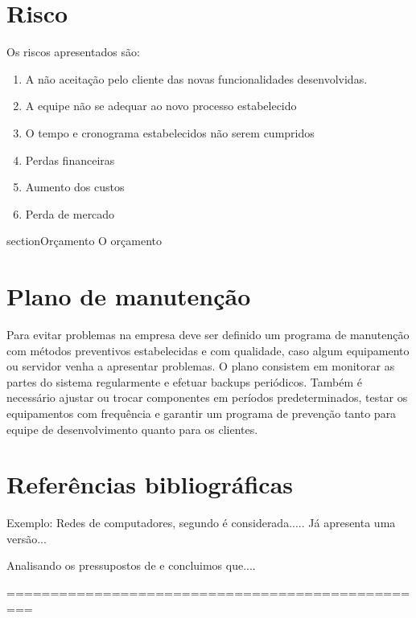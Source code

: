 \documentclass[	DIV=calc,%
							paper=a4,%
							fontsize=12pt,%
							onecolumn]{scrartcl}	 					%
\begin{document}
\section{Risco}
Os riscos apresentados são:

\begin{enumerate}
	\item A não aceitação pelo cliente das novas funcionalidades desenvolvidas.
	\item A equipe não se adequar ao novo processo estabelecido
	\item O tempo e cronograma estabelecidos não serem cumpridos
	\item Perdas financeiras
	\item Aumento dos custos
	\item Perda de mercado
\end{enumerate}


section{Orçamento}
O orçamento 

\section{Plano de manutenção}
Para evitar problemas na empresa deve ser definido um programa de manutenção com métodos preventivos estabelecidas e com qualidade, caso algum equipamento ou servidor venha a apresentar problemas. 
O plano consistem em monitorar as partes do sistema regularmente e efetuar backups periódicos. Também é necessário ajustar ou trocar componentes em períodos predeterminados, testar os equipamentos com frequência e garantir um programa de prevenção tanto para equipe de desenvolvimento quanto para os clientes.

\section{Referências bibliográficas}

Exemplo: Redes de computadores, segundo \cite{t2013} é considerada..... Já \cite{kurose2010} apresenta uma versão...

Analisando os pressupostos de \cite{ref3} e \cite{ref4} concluimos que....


\renewcommand\refname{} %

  

=================================================
\end{document}
